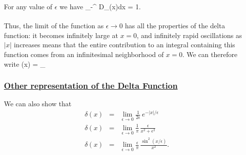 \noindent
For any value of $\epsilon$ we have
\be
\int_{-\infty}^{\infty} D_{\epsilon}(x)dx = 1.
\ee


\paragraph{}
Thus, the limit of the function as $\epsilon \rightarrow 0$ has all the properties of the delta function: it becomes infinitely large
at $x=0$, and infinitely rapid oscillations as $|x|$ increases means that the entire contribution to an integral containing this
function comes from an infinitesimal neighborhood of $x=0$. We can therefore write
\be
\delta(x) = \lim_{\epsilon {}} \, 
\ee

\vspace{10 mm}
\subsubsection{\underline{Other representation of the Delta Function}}
We can also show that
\begin{eqnarray}
\delta(x) &=& \lim_{\epsilon \rightarrow 0} \frac{1}{2\epsilon}\, e^{-|x|/\epsilon} \\
\delta(x) &=& \lim_{\epsilon \rightarrow 0} \frac{1}{\pi}\, \frac{\epsilon}{x^2+\epsilon^2} \\
\delta(x) &=& \lim_{\epsilon \rightarrow 0} \frac{\epsilon}{\pi}\, \frac{\sin^2(x/\epsilon)}{x^2}.
\end{eqnarray}



